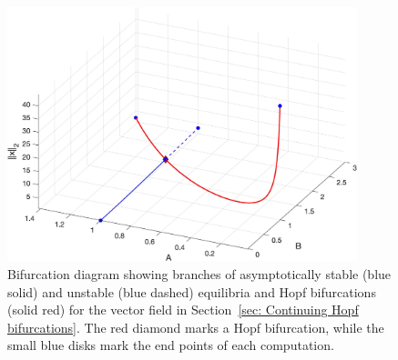 \begin{figure}[h]
\centering
\includegraphics[width=4in]{Figures/Section3_4_1.jpg}
\caption{Bifurcation diagram showing branches of asymptotically stable (blue solid) and unstable (blue dashed) equilibria and Hopf bifurcations (solid red) for the vector field in Section~\ref{sec: Continuing Hopf bifurcations}. The red diamond marks a Hopf bifurcation, while the small blue disks mark the end points of each computation.}
\label{fig: Section3_4_1}
\end{figure}


